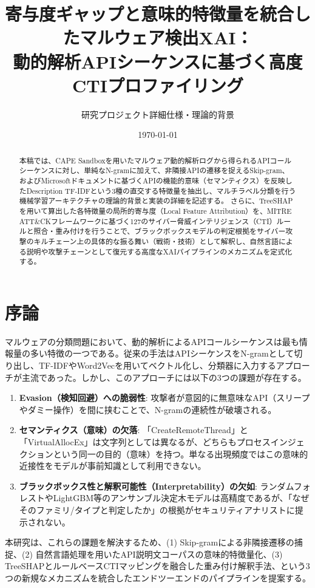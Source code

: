 \documentclass[11pt,a4paper,dvipdfmx]{article}
\title{寄与度ギャップと意味的特徴量を統合したマルウェア検出XAI：\\動的解析APIシーケンスに基づく高度CTIプロファイリング}
\author{研究プロジェクト詳細仕様・理論的背景}
\date{\today}
\begin{document}
\maketitle

\begin{abstract}
本稿では、CAPE Sandboxを用いたマルウェア動的解析ログから得られるAPIコールシーケンスに対し、単純なN-gramに加えて、非隣接APIの遷移を捉えるSkip-gram、およびMicrosoftドキュメントに基づくAPIの機能的意味（セマンティクス）を反映したDescription TF-IDFという3種の直交する特徴量を抽出し、マルチラベル分類を行う機械学習アーキテクチャの理論的背景と実装の詳細を記述する。
さらに、TreeSHAPを用いて算出した各特徴量の局所的寄与度（Local Feature Attribution）を、MITRE ATT\&CKフレームワークに基づく127のサイバー脅威インテリジェンス（CTI）ルールと照合・重み付けを行うことで、ブラックボックスモデルの判定根拠をサイバー攻撃のキルチェーン上の具体的な振る舞い（戦術・技術）として解釈し、自然言語による説明や攻撃チェーンとして復元する高度なXAIパイプラインのメカニズムを定式化する。
\end{abstract}

\tableofcontents
\newpage

\section{序論}
マルウェアの分類問題において、動的解析によるAPIコールシーケンスは最も情報量の多い特徴の一つである。従来の手法はAPIシーケンスをN-gramとして切り出し、TF-IDFやWord2Vecを用いてベクトル化し、分類器に入力するアプローチが主流であった。しかし、このアプローチには以下の3つの課題が存在する。
\begin{enumerate}
    \item \textbf{Evasion（検知回避）への脆弱性}: 攻撃者が意図的に無意味なAPI（スリープやダミー操作）を間に挟むことで、N-gramの連続性が破壊される。
    \item \textbf{セマンティクス（意味）の欠落}: 「CreateRemoteThread」と「VirtualAllocEx」は文字列としては異なるが、どちらもプロセスインジェクションという同一の目的（意味）を持つ。単なる出現頻度ではこの意味的近接性をモデルが事前知識として利用できない。
    \item \textbf{ブラックボックス性と解釈可能性（Interpretability）の欠如}: ランダムフォレストやLightGBM等のアンサンブル決定木モデルは高精度であるが、「なぜそのファミリ/タイプと判定したか」の根拠がセキュリティアナリストに提示されない。
\end{enumerate}

本研究は、これらの課題を解決するため、(1) Skip-gramによる非隣接遷移の捕捉、(2) 自然言語処理を用いたAPI説明文コーパスの意味的特徴量化、(3) TreeSHAPとルールベースCTIマッピングを融合した重み付け解釈手法、という3つの新規なメカニズムを統合したエンドツーエンドのパイプラインを提案する。
\end{document}
